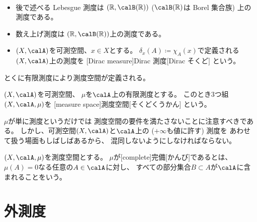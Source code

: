 \documentclass[report]{jlreq}
\begin{document}
\begin{example}[測度の例]
    ~
    \begin{itemize}
        \item 後で述べる Lebesgue 測度は
            $(\R, \calB(\R))$ ($\calB(\R)$は Borel 集合族)
            上の測度である。
        \item 数え上げ測度は
            $(\R, \calB(\R))$上の測度である。
        \item $(X, \calA)$を可測空間、$x \in X$とする。
            $\delta_x(A) \coloneqq \chi_A(x)$で定義される
            $(X, \calA)$上の測度を
            [Dirac measure]{Dirac 測度}[Dirac そくど]
            という。
    \end{itemize}
\end{example}

とくに有限測度により測度空間が定義される。

\begin{definition}[測度空間]
    $(X, \calA)$を可測空間、
    $\mu$を$\calA$上の有限測度とする。
    このとき3つ組$(X, \calA, \mu)$を
    [measure space]{測度空間}[そくどくうかん]
    という。
\end{definition}

\begin{remark}
    $\mu$が単に測度というだけでは
    測度空間の要件を満たさないことに注意すべきである。
    しかし、可測空間$(X, \calA)$と$\calA$上の ($+\infty$も値に許す) 測度を
    あわせて扱う場面もしばしばあるから、
    混同しないようにしなければならない。
\end{remark}

\begin{definition}[完備な測度]
    $(X, \calA, \mu)$を測度空間とする。
    $\mu$が[complete]{完備}[かんび]であるとは、
    $\mu(A) = 0$なる任意の$A \in \calA$に対し、
    すべての部分集合$B \subset A$が$\calA$に含まれることをいう。
\end{definition}


%
\section{外測度}


%
\end{document}
